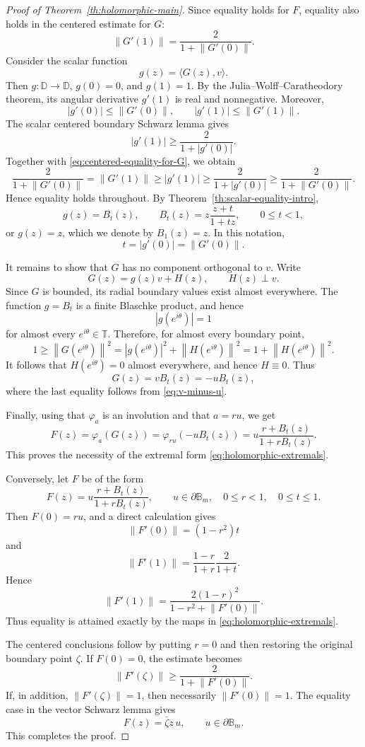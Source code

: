 \documentclass[11pt]{amsart}
\theoremstyle{definition}
\theoremstyle{remark}
\newcommand{\D}{\mathbb D}
\newcommand{\T}{\mathbb T}
\newcommand{\B}{\mathbb B}
\newcommand{\inner}[2]{\langle #1,#2\rangle}
\newcommand{\norm}[1]{\left\|#1\right\|}
\begin{document}
\begin{proof}[Proof of Theorem~\ref{th:holomorphic-main}]
Since equality holds for \(F\), equality also holds in the centered estimate for \(G\):
\begin{equation}\label{eq:centered-equality-for-G}
        \norm{G'(1)}=\frac{2}{1+\norm{G'(0)}}.
\end{equation}
Consider the scalar function
\[
        g(z)=\inner{G(z)}{v}.
\]
Then \(g:\D\to\D\), \(g(0)=0\), and \(g(1)=1\). By the Julia--Wolff--Caratheodory theorem, its angular derivative \(g'(1)\) is real and nonnegative. Moreover,
\[
        |g'(0)|\le \norm{G'(0)},
        \qquad
        |g'(1)|\le \norm{G'(1)}.
\]
The scalar centered boundary Schwarz lemma gives
\[
        |g'(1)|\ge \frac{2}{1+|g'(0)|}.
\]
Together with \eqref{eq:centered-equality-for-G}, we obtain
\[
        \frac{2}{1+\norm{G'(0)}}
        =\norm{G'(1)}
        \ge |g'(1)|
        \ge \frac{2}{1+|g'(0)|}
        \ge \frac{2}{1+\norm{G'(0)}}.
\]
Hence equality holds throughout. By Theorem~\ref{th:scalar-equality-intro},
\[
        g(z)=B_t(z),
        \qquad
        B_t(z)=z\frac{z+t}{1+tz},
        \qquad 0\le t<1,
\]
or \(g(z)=z\), which we denote by \(B_1(z)=z\). In this notation,
\[
        t=|g'(0)|=\norm{G'(0)}.
\]

It remains to show that \(G\) has no component orthogonal to \(v\). Write
\[
        G(z)=g(z)v+H(z),
        \qquad H(z)\perp v.
\]
Since \(G\) is bounded, its radial boundary values exist almost everywhere. The function \(g=B_t\) is a finite Blaschke product, and hence
\[
        |g(e^{i\theta})|=1
\]
for almost every \(e^{i\theta}\in\T\). Therefore, for almost every boundary point,
\[
        1\ge \norm{G(e^{i\theta})}^2
        =|g(e^{i\theta})|^2+\norm{H(e^{i\theta})}^2
        =1+\norm{H(e^{i\theta})}^2.
\]
It follows that \(H(e^{i\theta})=0\) almost everywhere, and hence \(H\equiv0\). Thus
\[
        G(z)=vB_t(z)=-uB_t(z),
\]
where the last equality follows from \eqref{eq:v-minus-u}.

Finally, using that \(\varphi_a\) is an involution and that \(a=ru\), we get
\[
        F(z)=\varphi_a(G(z))
        =\varphi_{ru}(-uB_t(z))
        =u\frac{r+B_t(z)}{1+rB_t(z)}.
\]
This proves the necessity of the extremal form \eqref{eq:holomorphic-extremals}.

Conversely, let \(F\) be of the form
\[
        F(z)=u\frac{r+B_t(z)}{1+rB_t(z)},
        \qquad
        u\in\partial\B_m,
        \quad 0\le r<1,
        \quad 0\le t\le1.
\]
Then \(F(0)=ru\), and a direct calculation gives
\[
        \norm{F'(0)}=(1-r^2)t
\]
and
\[
        \norm{F'(1)}
        =\frac{1-r}{1+r}\frac{2}{1+t}.
\]
Hence
\[
        \norm{F'(1)}
        =
        \frac{2(1-r)^2}{1-r^2+\norm{F'(0)}}.
\]
Thus equality is attained exactly by the maps in \eqref{eq:holomorphic-extremals}.

The centered conclusions follow by putting \(r=0\) and then restoring the original boundary point \(\zeta\). If \(F(0)=0\), the estimate becomes
\[
        \norm{F'(\zeta)}\ge \frac{2}{1+\norm{F'(0)}}.
\]
If, in addition, \(\norm{F'(\zeta)}=1\), then necessarily \(\norm{F'(0)}=1\). The equality case in the vector Schwarz lemma gives
\[
        F(z)=\bar\zeta z\,u,
        \qquad u\in\partial\B_m.
\]
This completes the proof.
\end{proof}
\end{document}
